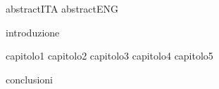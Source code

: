 \documentclass[11pt,a4paper,twoside]{book}
\theoremstyle{plain}
\theoremstyle{definition}
\theoremstyle{remark}
\begin{document}
 {abstractITA}
 {abstractENG}

\renewcommand{\theequation}{\arabic{equation}}%
\renewcommand{\thesection}{\arabic{section}}%
 {introduzione}
\renewcommand{\theequation}{\thechapter.\arabic{equation}}%
\renewcommand{\thesection}{\thechapter.\arabic{section}}%
\tableofcontents





 {capitolo1} 
 {capitolo2}
 {capitolo3}
 {capitolo4}
 {capitolo5}







\renewcommand{\theequation}{\arabic{equation}}%
\renewcommand{\thesection}{\arabic{section}}%
 {conclusioni}
\renewcommand{\theequation}{\thechapter.\arabic{equation}}%
\renewcommand{\thesection}{\thechapter.\arabic{section}}%
\appendix
























\backmatter
\listoffigures
\listoftables

 
\end{document}
